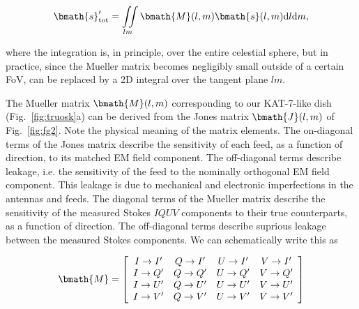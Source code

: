 \documentclass[fleqn,usenatbib]{mnras}
\begin{document}
\begin{equation}  
\bmath{s}'_\mathrm{tot} = \iint\limits_{lm} \bmath{M}(l,m) \bmath{s}(l,m) \mathrm{d}l \mathrm{d}m,
\end{equation}

\noindent where the integration is, in principle, over the entire celestial sphere, but in practice, since the Mueller matrix becomes negligibly small outside of a certain FoV, can be replaced by a 2D integral over the tangent plane $lm$. 

The Mueller matrix $\bmath{M}(l,m)$ corresponding to our KAT-7-like dish (Fig.~\ref{fig:truosk}a) can be derived from the Jones matrix $\bmath{J}(l,m)$ of 
Fig.~\ref{fig:fg2}. Note the physical meaning of the matrix elements. The on-diagonal terms of the Jones matrix describe the sensitivity 
of each feed, as a function of direction, to its matched EM field component. The off-diagonal terms describe leakage, i.e. the sensitivity of the 
feed to the nominally orthogonal EM field component. This leakage is due to mechanical and electronic imperfections in the antennas and feeds. The diagonal 
terms of the Mueller matrix describe the sensitivity of the measured Stokes $IQUV$ components to their true counterparts, as a function of direction. The off-diagonal terms describe suprious leakage between the measured Stokes components. We can schematically write this as

$$ \bmath{M}  =       
\left[ \begin{array}{cccc}
                        I \rightarrow I' & Q \rightarrow I' & U \rightarrow  I' & V \rightarrow  I' \\
                        I \rightarrow Q' & Q \rightarrow Q' & U \rightarrow  Q' & V \rightarrow  Q'\\
                        I \rightarrow U' & Q \rightarrow U' & U \rightarrow  U' & V \rightarrow  U'\\
                        I \rightarrow V' & Q \rightarrow V' & U \rightarrow  V' & V \rightarrow  V' 
\end{array} \right]                    
$$\\
\end{document}
